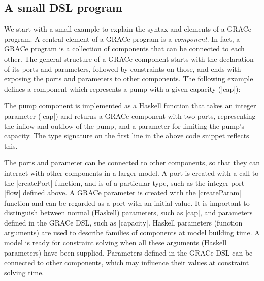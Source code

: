 \documentclass{article}
\begin{document}
\subsection{A small DSL program}

We start with a small example to explain the syntax and elements of a
GRACe program.
%
A central element of a GRACe program is a \emph{component}.
%
In fact, a GRACe program is a collection of components that can be
connected to each other.
%
The general structure of a GRACe component starts with the declaration
of its ports and parameters, followed by constraints on those, and
ends with exposing the ports and parameters to other components.
%
The following example defines a component which represents a pump with
a given capacity (|cap|):
%
The pump component is implemented as a Haskell function that takes an
integer parameter (|cap|) and returns a GRACe component with two
ports, representing the inflow and outflow of the pump, and a
parameter for limiting the pump's capacity.
%
The type signature on the first line in the above code snippet
reflects this.

The ports and parameter can be connected to other components, so that
they can interact with other components in a larger model.
%
A port is created with a call to the |createPort| function, and is of
a particular type, such as the integer port |flow| defined above.
%
A GRACe parameter is created with the |createParam| function and can
be regarded as a port with an initial value.
%
It is important to distinguish between normal (Haskell) parameters,
such as |cap|, and parameters defined in the GRACe DSL, such as
|capacity|.
%
Haskell parameters (function arguments) are used to describe families
of components at model building time.
%
A model is ready for constraint solving when all these arguments
(Haskell parameters) have been supplied.
%
Parameters defined in the GRACe DSL can be connected to other
components, which may influence their values at constraint solving
time.
\end{document}
